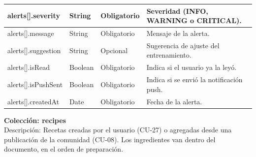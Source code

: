 {\begin{longtable}{|>{\raggedright\arraybackslash}p{4.7cm}|>{\raggedright\arraybackslash}p{1.8cm}|>{\raggedright\arraybackslash}p{2.3cm}|>{\raggedright\arraybackslash}p{5.4cm}|}
    alerts[]\allowbreak .\allowbreak severity & String & Obligatorio & Severidad (INFO, WARNING o CRITICAL). \\ \hline
    alerts[]\allowbreak .\allowbreak message & String & Obligatorio & Mensaje de la alerta. \\ \hline
    alerts[]\allowbreak .\allowbreak suggestion & String & Opcional & Sugerencia de ajuste del entrenamiento. \\ \hline
    alerts[]\allowbreak .\allowbreak isRead & Boolean & Obligatorio & Indica si el usuario ya la leyó. \\ \hline
    alerts[]\allowbreak .\allowbreak isPushSent & Boolean & Obligatorio & Indica si se envió la notificación push. \\ \hline
    alerts[]\allowbreak .\allowbreak createdAt & Date & Obligatorio & Fecha de la alerta. \\ \hline
\end{longtable}
}
\noindent\textbf{Colección: recipes} \\
Descripción: Recetas creadas por el usuario (CU-27) o agregadas desde una publicación de la comunidad (CU-08). Los ingredientes van dentro del documento, en el orden de preparación.
